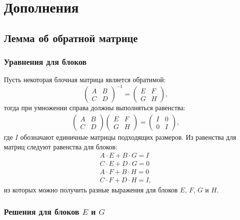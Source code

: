 \chapter{Дополнения}

\section{Лемма об обратной матрице} \label{section:appendix:inversions}

\subsection{Уравнения для блоков}

Пусть некоторая блочная матрица является обратимой:
$$
	\begin{pmatrix}
		A & B \\
		C & D
	\end{pmatrix}^{-1}
	=
	\begin{pmatrix}
		E & F \\
		G & H
	\end{pmatrix}
	,
$$
тогда при умножении справа должны выполняться равенства:
\begin{gather*}
	\begin{pmatrix}
		A & B \\
		C & D
	\end{pmatrix}
	\begin{pmatrix}
		E & F \\
		G & H
	\end{pmatrix}
	=
	\begin{pmatrix}
		I & 0 \\
		0 & I
	\end{pmatrix} ,
\end{gather*}
где $I$ обозначают единичные матрицы подходящих размеров. Из равенства для матриц следуют равенства для блоков:
\begin{gather}
	A \cdot E + B \cdot G = I \label{equation:filtering:appendix:inversions:1} \\
	C \cdot E + D \cdot G = 0 \label{equation:filtering:appendix:inversions:2} \\
	A \cdot F + B \cdot H = 0 \label{equation:filtering:appendix:inversions:3} \\
	C \cdot F + D \cdot H = I \label{equation:filtering:appendix:inversions:4}
	,
\end{gather}
из которых можно получить разные выражения для блоков $E$, $F$, $G$ и $H$.

\subsection{Решения для блоков $E$ и $G$}

